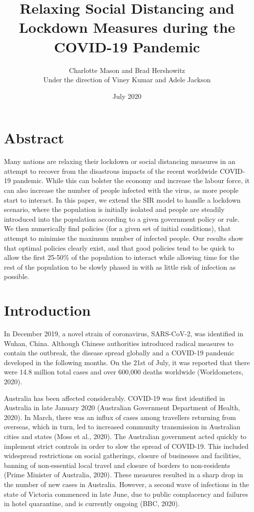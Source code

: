 \documentclass[10pt]{article}
\title{Relaxing Social Distancing and Lockdown Measures during the COVID-19 Pandemic}
\author{Charlotte Mason and Brad Hershowitz \\Under the direction of Viney Kumar and Adele Jackson}
\date{July 2020}
\begin{document}
\sloppy

\maketitle

\section{Abstract}

Many nations are relaxing their lockdown or social distancing measures in an attempt to recover from the disastrous impacts of the recent worldwide COVID-19 pandemic. While this can bolster the economy and increase the labour force, it can also increase the number of people infected with the virus, as more people start to interact. In this paper, we extend the SIR model to handle a lockdown scenario, where the population is initially isolated and people are steadily introduced into the population according to a given government policy or rule. We then numerically find policies (for a given set of initial conditions), that attempt to minimise the maximum number of infected people. Our results show that optimal policies clearly exist, and that good policies tend to be quick to allow the first 25-50\% of the population to interact while allowing time for the rest of the population to be slowly phased in with as little risk of infection as possible.

\section{Introduction}

In December 2019, a novel strain of coronavirus, SARS-CoV-2, was identified in Wuhan, China. Although Chinese authorities introduced radical measures to contain the outbreak, the disease spread globally and a COVID-19 pandemic developed in the following months. On the 21st of July, it was reported that there were 14.8 million total cases and over 600,000 deaths worldwide (Worldometers, 2020). \newline

Australia has been affected considerably. COVID-19 was first identified in Australia in late January 2020 (Australian Government Department of Health, 2020). In March, there was an influx of cases among travellers returning from overseas, which in turn, led to increased community transmission in Australian cities and states (Moss et al., 2020). The Australian government acted quickly to implement strict controls in order to slow the spread of COVID-19. This included widespread restrictions on social gatherings, closure of businesses and facilities, banning of non-essential local travel and closure of borders to non-residents (Prime Minister of Australia, 2020). These measures resulted in a sharp drop in the number of new cases in Australia. However, a second wave of infections in the state of Victoria commenced in late June, due to public complacency and failures in hotel quarantine, and is currently ongoing (BBC, 2020). \newline
\end{document}
